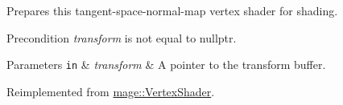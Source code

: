 Prepares this tangent-\/space-\/normal-\/map vertex shader for shading.

\begin{DoxyPrecond}{Precondition}
{\itshape transform} is not equal to {\ttfamily nullptr}. 
\end{DoxyPrecond}

\begin{DoxyParams}[1]{Parameters}
\mbox{\tt in}  & {\em transform} & A pointer to the transform buffer. \\
\hline
\end{DoxyParams}


Reimplemented from \hyperlink{classmage_1_1_vertex_shader_a53f4b25241f6c5739724d421c9f29a36}{mage\+::\+Vertex\+Shader}.

